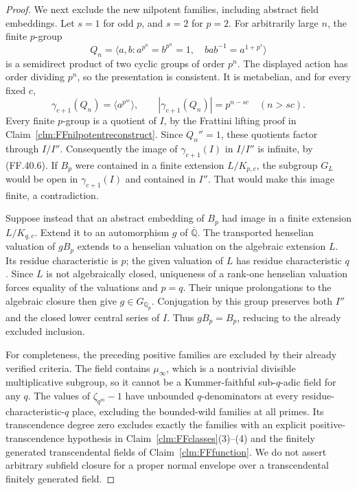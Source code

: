 \begin{proof}
We next exclude the new nilpotent
families, including abstract field
embeddings. Let \(s=1\) for
odd \(p\), and \(s=2\) for
\(p=2\). For arbitrarily large
\(n\), the finite \(p\)-group
\[
 Q_n=\langle a,b:
       a^{p^n}=b^{p^n}=1,\quad
       bab^{-1}=a^{1+p^s}\rangle
                                                        \tag{FF.40.5}
\]
is a semidirect product of two
cyclic groups of order \(p^n\).
The displayed action has order
dividing \(p^n\), so the
presentation is consistent.
It is metabelian, and for every
fixed \(c\),
\[
           \gamma_{c+1}(Q_n)
                  =\langle a^{p^{sc}}\rangle,
            \qquad
           |\gamma_{c+1}(Q_n)|=p^{n-sc}
                   \quad(n>sc).
                                                        \tag{FF.40.6}
\]
Every finite \(p\)-group is a
quotient of \(I\), by the
Frattini lifting proof in
Claim~\ref{clm:FFnilpotentreconstruct}.
Since \(Q_n''=1\), these quotients
factor through \(I/I''\).
Consequently the image of
\(\gamma_{c+1}(I)\) in
\(I/I''\) is infinite, by
(FF.40.6).
If \(B_p\) were contained in
a finite extension \(L/K_{p,c}\),
the subgroup \(G_L\) would be
open in \(\gamma_{c+1}(I)\)
and contained in \(I''\).
That would make this image
finite, a contradiction.

Suppose instead that an abstract
embedding of \(B_p\) had image
in a finite extension \(L/K_{q,c}\).
Extend it to an automorphism
\(g\) of \(\overline{\mathbb Q}\).
The transported henselian valuation
of \(gB_p\) extends to a henselian
valuation on the algebraic extension
\(L\). Its residue characteristic
is \(p\); the given valuation
of \(L\) has residue characteristic
\(q\). Since \(L\) is not
algebraically closed, uniqueness
of a rank-one henselian valuation
forces equality of the valuations
and \(p=q\). Their unique
prolongations to the algebraic
closure then give \(g\in G_{\mathbb Q_p}\).
Conjugation by this group preserves
both \(I''\) and the closed
lower central series of \(I\).
Thus \(gB_p=B_p\), reducing to
the already excluded inclusion.

For completeness, the preceding
positive families are excluded
by their already verified criteria.
The field contains \(\mu_\infty\),
which is a nontrivial divisible
multiplicative subgroup, so it
cannot be a Kummer-faithful
sub-\(q\)-adic field for any
\(q\). The values of
\(\zeta_{q^m}-1\) have unbounded
\(q\)-denominators at every
residue-characteristic-\(q\)
place, excluding the bounded-wild
families at all primes.
Its transcendence degree zero
excludes exactly the families with an explicit
positive-transcendence hypothesis in
Claim~\ref{clm:FFclasses}(3)--(4) and the
finitely generated transcendental fields
of Claim~\ref{clm:FFfunction}.
We do not assert arbitrary subfield
closure for a proper normal envelope
over a transcendental finitely generated field.


\end{proof}
